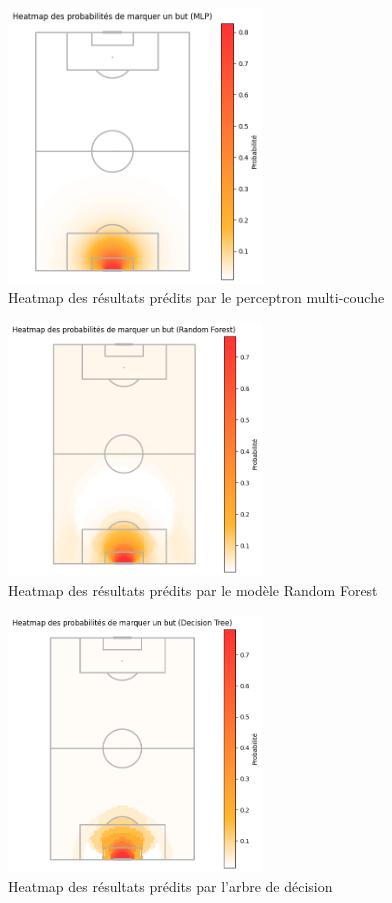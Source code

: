 \documentclass[12pt]{article}
\begin{document}
\begin{figure}[htp]
    \centering
    \includegraphics[width=0.6\textwidth]{img/pitch_visualisation_mlp.png}
    \caption{Heatmap des résultats prédits par le perceptron multi-couche}
    \label{fig:result_mlp}
\end{figure}

\begin{figure}[htp]
    \centering
    \includegraphics[width=0.6\textwidth]{img/pitch_visualisation_random_forest.png}
    \caption{Heatmap des résultats prédits par le modèle Random Forest}
    \label{fig:result_random_forest}
\end{figure}

\begin{figure}[htp]
    \centering
    \includegraphics[width=0.6\textwidth]{img/pitch_visualisation_tree.png}
    \caption{Heatmap des résultats prédits par l'arbre de décision}
    \label{fig:result_tree}
\end{figure}
\end{document}
